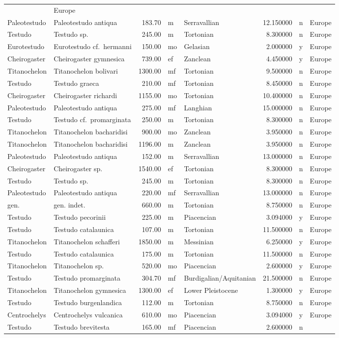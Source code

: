 \begin{landscape}
\begin{longtable}[]{@{}llrllrll@{}}
	& Europe\tabularnewline
	Paleotestudo & Paleotestudo antiqua & 183.70 & m & Serravallian &
	12.150000 & n & Europe\tabularnewline
	Testudo & Testudo sp. & 245.00 & m & Tortonian & 8.300000 & n &
	Europe\tabularnewline
	Eurotestudo & Eurotestudo cf.~hermanni & 150.00 & mo & Gelasian &
	2.000000 & y & Europe\tabularnewline
	Cheirogaster & Cheirogaster gymnesica & 739.00 & ef & Zanclean &
	4.450000 & y & Europe\tabularnewline
	Titanochelon & Titanochelon bolivari & 1300.00 & mf & Tortonian &
	9.500000 & n & Europe\tabularnewline
	Testudo & Testudo graeca & 210.00 & mf & Tortonian & 8.450000 & n &
	Europe\tabularnewline
	Cheirogaster & Cheirogaster richardi & 1155.00 & mo & Tortonian &
	10.400000 & n & Europe\tabularnewline
	Paleotestudo & Paleotestudo antiqua & 275.00 & mf & Langhian & 15.000000
	& n & Europe\tabularnewline
	Testudo & Testudo cf.~promarginata & 250.00 & m & Tortonian & 8.300000 &
	n & Europe\tabularnewline
	Titanochelon & Titanochelon bacharidisi & 900.00 & mo & Zanclean &
	3.950000 & n & Europe\tabularnewline
	Titanochelon & Titanochelon bacharidisi & 1196.00 & m & Zanclean &
	3.950000 & n & Europe\tabularnewline
	Paleotestudo & Paleotestudo antiqua & 152.00 & m & Serravallian &
	13.000000 & n & Europe\tabularnewline
	Cheirogaster & Cheirogaster sp. & 1540.00 & ef & Tortonian & 8.300000 &
	n & Europe\tabularnewline
	Testudo & Testudo sp. & 245.00 & m & Tortonian & 8.300000 & n &
	Europe\tabularnewline
	Paleotestudo & Paleotestudo antiqua & 220.00 & mf & Serravallian &
	13.000000 & n & Europe\tabularnewline
	gen. & gen. indet. & 660.00 & m & Tortonian & 8.750000 & n &
	Europe\tabularnewline
	Testudo & Testudo pecorinii & 225.00 & m & Piacencian & 3.094000 & y &
	Europe\tabularnewline
	Testudo & Testudo catalaunica & 107.00 & m & Tortonian & 11.500000 & n &
	Europe\tabularnewline
	Titanochelon & Titanochelon schafferi & 1850.00 & m & Messinian &
	6.250000 & y & Europe\tabularnewline
	Testudo & Testudo catalaunica & 175.00 & m & Tortonian & 11.500000 & n &
	Europe\tabularnewline
	Titanochelon & Titanochelon sp. & 520.00 & mo & Piacencian & 2.600000 &
	y & Europe\tabularnewline
	Testudo & Testudo promarginata & 304.70 & mf & Burdigalian/Aquitanian &
	21.500000 & n & Europe\tabularnewline
	Titanochelon & Titanochelon gymnesica & 1300.00 & ef & Lower Pleistocene
	& 1.300000 & y & Europe\tabularnewline
	Testudo & Testudo burgenlandica & 112.00 & m & Tortonian & 8.750000 & n
	& Europe\tabularnewline
	Centrochelys & Centrochelys vulcanica & 610.00 & mo & Piacencian &
	3.094000 & y & Europe\tabularnewline
	Testudo & Testudo brevitesta & 165.00 & mf & Piacencian & 2.600000 & n &

\end{longtable}
\end{landscape}

